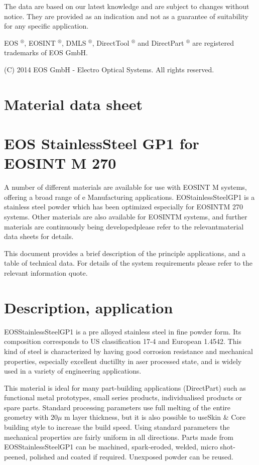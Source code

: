 \documentclass[10pt]{article}
\begin{document}
The data are based on our latest knowledge and are subject to changes without notice. They are provided as an indication and not as a guarantee of suitability for any specific application.

EOS $^{\circledR}$, EOSINT $^{\circledR}$, DMLS $^{\circledR}$, DirectTool ${ }^{\circledR}$ and DirectPart ${ }^{\circledR}$ are registered trademarks of EOS GmbH.

(C) 2014 EOS GmbH - Electro Optical Systems. All rights reserved.

\section*{Material data sheet}
\section*{EOS StainlessSteel GP1 for EOSINT M 270}
A number of different materials are available for use with EOSINT M systems, offering a broad range of e Manufacturing applications. EOStainlessSteelGP1 is a stainless steel powder which has been optimized especially for EOSINTM 270 systems. Other materials are also available for EOSINTM systems, and further materials are continuously being developedplease refer to the relevantmaterial data sheets for details.

This document provides a brief description of the principle applications, and a table of technical data. For details of the system requirements please refer to the relevant information quote.

\section*{Description, application}
EOSStainlessSteelGP1 is a pre alloyed stainless steel in fine powder form. Its composition corresponds to US classification 17-4 and European 1.4542. This kind of steel is characterized by having good corrosion resistance and mechanical properties, especially excellent ductillty in aser processed state, and is widely used in a variety of engineering applications.

This material is ideal for many part-building applications (DirectPart) such as functional metal prototypes, small series products, individualised products or spare parts. Standard processing parameters use full melting of the entire geometry with $20 \mu$ m layer thickness, but it is also possible to useSkin \& Core building style to increase the build speed. Using standard parameters the mechanical properties are fairly uniform in all directions. Parts made from EOSStainlessSteelGP1 can be machined, spark-eroded, welded, micro shot-peened, polished and coated if required. Unexposed powder can be reused.
\end{document}

